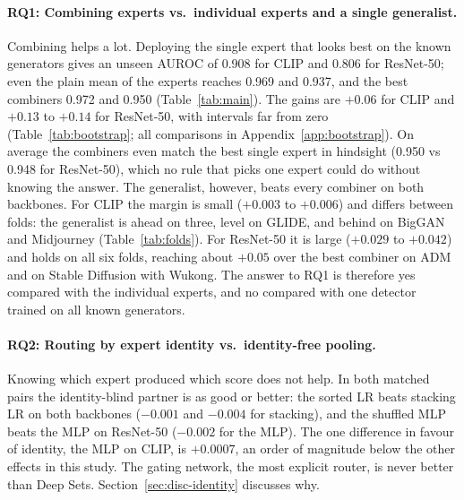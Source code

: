 \documentclass[10pt,a4paper]{article}
\begin{document}
\paragraph{RQ1: Combining experts vs.\ individual experts and a single generalist.}
Combining helps a lot. Deploying the single expert that looks best on the known generators gives an unseen AUROC of 0.908 for CLIP and 0.806 for ResNet-50; even the plain mean of the experts reaches 0.969 and 0.937, and the best combiners 0.972 and 0.950 (Table~\ref{tab:main}). The gains are $+0.06$ for CLIP and $+0.13$ to $+0.14$ for ResNet-50, with intervals far from zero (Table~\ref{tab:bootstrap}; all comparisons in Appendix~\ref{app:bootstrap}). On average the combiners even match the best single expert in hindsight (0.950 vs 0.948 for ResNet-50), which no rule that picks one expert could do without knowing the answer. The generalist, however, beats every combiner on both backbones. For CLIP the margin is small ($+0.003$ to $+0.006$) and differs between folds: the generalist is ahead on three, level on GLIDE, and behind on BigGAN and Midjourney (Table~\ref{tab:folds}). For ResNet-50 it is large ($+0.029$ to $+0.042$) and holds on all six folds, reaching about $+0.05$ over the best combiner on ADM and on Stable Diffusion with Wukong. The answer to RQ1 is therefore yes compared with the individual experts, and no compared with one detector trained on all known generators.

\paragraph{RQ2: Routing by expert identity vs.\ identity-free pooling.}
Knowing which expert produced which score does not help. In both matched pairs the identity-blind partner is as good or better: the sorted LR beats stacking LR on both backbones ($-0.001$ and $-0.004$ for stacking), and the shuffled MLP beats the MLP on ResNet-50 ($-0.002$ for the MLP). The one difference in favour of identity, the MLP on CLIP, is $+0.0007$, an order of magnitude below the other effects in this study. The gating network, the most explicit router, is never better than Deep Sets. Section~\ref{sec:disc-identity} discusses why.
\end{document}

